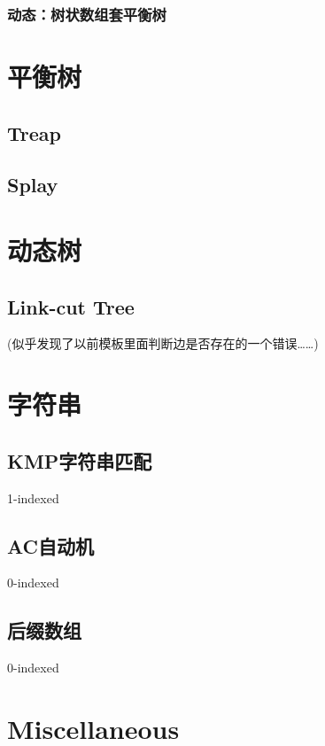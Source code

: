 \documentclass{article}
\begin{document}
		\subsubsection{动态：树状数组套平衡树}
		
	\newpage

	\section{平衡树}
		\subsection{Treap}
		
		\subsection{Splay}
		

	\newpage

	\section{动态树}
		\subsection{Link-cut Tree}
		(似乎发现了以前模板里面判断边是否存在的一个错误……)
		
	\newpage

	\section{字符串}
		\subsection{KMP字符串匹配}
		1-indexed
		
		\subsection{AC自动机}
		0-indexed
		
		\subsection{后缀数组}
		0-indexed
		

	\newpage

	\section{Miscellaneous}
\end{document}
